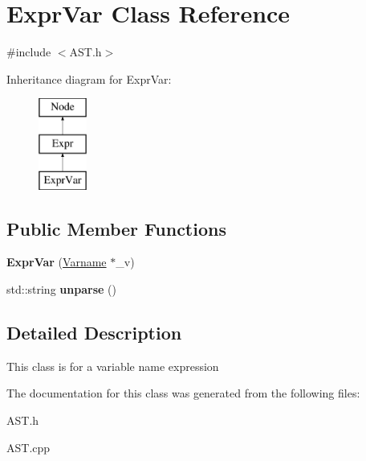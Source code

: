 \hypertarget{classExprVar}{\section{Expr\-Var Class Reference}
\label{classExprVar}
}


{\ttfamily \#include $<$A\-S\-T.\-h$>$}

Inheritance diagram for Expr\-Var\-:\begin{figure}[H]
\begin{center}
\leavevmode
\includegraphics[height=3.000000cm]{classExprVar}
\end{center}
\end{figure}
\subsection*{Public Member Functions}
\begin{DoxyCompactItemize}
\item 
\hypertarget{classExprVar_a1d364d77e8a4eba1ed3c546602b17157}{{\bfseries Expr\-Var} (\hyperlink{classVarname}{Varname} $\ast$\-\_\-v)}\label{classExprVar_a1d364d77e8a4eba1ed3c546602b17157}

\item 
\hypertarget{classExprVar_aea5a227b096764682224ea2cec02a05f}{std\-::string {\bfseries unparse} ()}\label{classExprVar_aea5a227b096764682224ea2cec02a05f}

\end{DoxyCompactItemize}


\subsection{Detailed Description}
This class is for a variable name expression 

The documentation for this class was generated from the following files\-:\begin{DoxyCompactItemize}
\item 
A\-S\-T.\-h\item 
A\-S\-T.\-cpp\end{DoxyCompactItemize}
